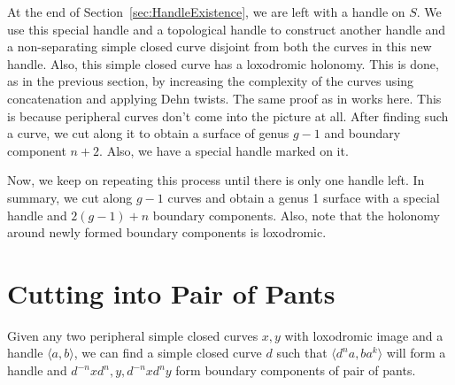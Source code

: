 At the end of Section~\ref{sec:HandleExistence}, we are left with a handle on $S$. We use this special handle and a topological handle to construct another handle and a non-separating simple closed curve disjoint from both the curves in this new handle. Also, this simple closed curve has a loxodromic holonomy. This is done, as in the previous section, by increasing the complexity of the curves using concatenation and applying Dehn twists. The same proof as in \cite{GKM} works here. This is because peripheral curves don't come into the picture at all. After finding such a curve, we cut along it to obtain a surface of genus $g-1$ and boundary component $n+2$. Also, we have a special handle marked on it.

Now, we keep on repeating this process until there is only one handle left. In summary, we cut along $g-1$ curves and obtain a genus 1 surface with a special handle and $2(g-1)+n$ boundary components. Also, note that the holonomy around newly formed boundary components is loxodromic.

%



\section{Cutting into Pair of Pants}\label{sec:cuttingintoPoP}
\begin{prop}
	Given any two peripheral simple closed curves $x,y$ with loxodromic image and a handle $\langle a, b \rangle$, we can find a simple closed curve $d$ such that  $\langle d^n a, b a^k \rangle$ will form a handle and $d^{-n} x d^n, y , d^{-n} x d^n y$ form boundary components of pair of pants.
\end{prop}

